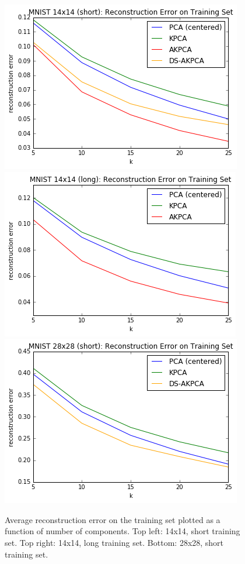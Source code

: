 \documentclass[]{article}
\begin{document}
\begin{figure}[h]
\begin{center}
\includegraphics[scale=0.5]{figures/mnist_14_short_recon_training}
\includegraphics[scale=0.5]{figures/mnist_14_long_recon_training}
\includegraphics[scale=0.5]{figures/mnist_28_short_recon_training}
\caption{Average reconstruction error on the training set plotted as a function of number of components.  Top left: 14x14, short training set.  Top right: 14x14, long training set. Bottom: 28x28, short training set.}
\label{recon-err-training}
\end{center}
\end{figure}
\end{document}
